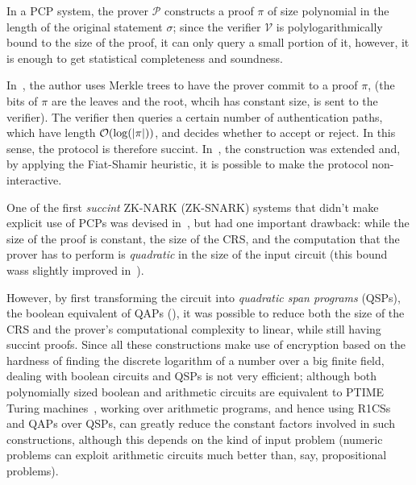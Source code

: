 In a PCP system, the prover \(\mathcal{P}\) constructs a proof \(\pi \) of size polynomial in the 
length of the original statement \(\sigma \); since the verifier \(\mathcal{V}\) is 
polylogarithmically bound to the size of the proof, it can only query a small portion of it, 
however, it is enough to get statistical completeness and soundness.

In~\cite{Kilian1992}, the author uses Merkle trees to have the prover commit to a proof \(\pi \), 
(the bits of \(\pi \) are the leaves and the root, whcih has constant size, is sent to the verifier). 
The verifier then queries a certain number of authentication paths, which have length
\(\BigO{\call{\log}{\abs{\pi}}}\), and decides whether to accept or reject.
In this sense, the protocol is therefore succint.
In~\cite{Micali2000}, the construction was extended and, by applying the Fiat-Shamir heuristic, it 
is possible to make the protocol non-interactive.

One of the first \emph{succint} ZK-NARK (ZK-SNARK) systems that didn't make explicit use of 
PCPs was devised in~\cite{Groth2010}, but had one important drawback: while the size of the proof 
is constant, the size of the CRS, and the computation that the prover has to perform is 
\emph{quadratic} in the size of the input circuit
(this bound wass slightly improved in~\cite{Lipmaa2011}).

However, by first transforming the circuit into \emph{quadratic span programs} (QSPs), 
the boolean equivalent of QAPs (), it was possible to reduce both the size of the 
CRS and the prover's computational complexity to linear, while still having succint proofs.
Since all these constructions make use of encryption based on the hardness of finding the discrete
logarithm of a number over a big finite field, dealing with boolean circuits and QSPs is not 
very efficient; although both polynomially sized boolean and arithmetic circuits are equivalent to 
\textsc{PTIME} Turing machines~\cite{PippengerF1979}, working over arithmetic programs, and hence 
using R1CSs~\cite{CramerD1998} and QAPs over QSPs, can greatly reduce the constant factors involved 
in such constructions, although this depends on the kind of input problem (numeric problems 
can exploit arithmetic circuits much better than, say, propositional problems).

